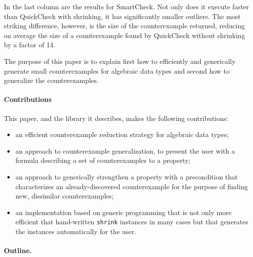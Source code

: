 \documentclass[9pt]{sigplanconf}
\newcommand{\ttp}[1]{\texttt{#1}}
\begin{document}
In the last column are the results for SmartCheck.  Not only does it execute
faster than QuickCheck with shrinking, it has significantly smaller outliers.
The most striking difference, however, is the size of the counterexample
returned, reducing on average the size of a counterexample found by QuickCheck
without shrinking by a factor of 14.

The purpose of this paper is to explain first how to efficiently and generically
generate small counterexamples for algebraic data types and second how to
generalize the counterexamples.

\paragraph{Contributions}
This paper, and the library it describes, makes the following contributions:

\begin{itemize}

\item an efficient counterexample reduction strategy for algebraic
  data types;

\item an approach to counterexample generalization, to present the
  user with a formula describing a set of counterexamples to a property;

\item an approach to generically strengthen a property with a precondition that
  characterizes an already-discovered counterexample for the purpose of finding
  new, dissimilar counterexamples;

\item an implementation based on generic programming that is not only more
  efficient that hand-written \ttp{shrink} instances in many cases but that
  generates the instances automatically for the user.

\end{itemize}


\paragraph{Outline.}
\end{document}

